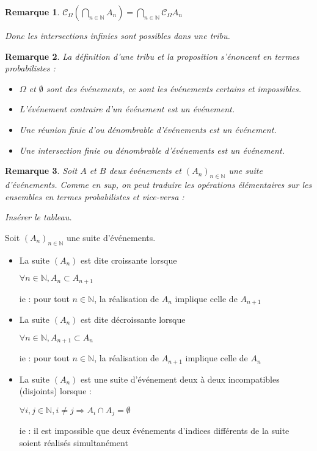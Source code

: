 \documentclass[a4paper,12pt]{book}
\newcommand{\Def}[2]{\begin{tcolorbox}[sharp corners, colback=white,colframe=blue!90!black!75, title=Définition : #1]#2\end{tcolorbox}}
\newtheorem{Rem}{Remarque}[section]
\def\N{\mathbb{N}}
\begin{document}
\begin{Rem}
$\mathcal{C}_\Omega\left(\bigcap_{n\in\N}A_n\right) = \bigcap_{n\in\N}\mathcal{C}_\Omega A_n$
\par Donc les intersections infinies sont possibles dans une tribu.
\end{Rem}
\begin{Rem}
La définition d'une tribu et la proposition s'énoncent en termes probabilistes :\begin{itemize}
\item $\Omega$ et $\emptyset$ sont des événements, ce sont les événements certains et impossibles.
\item L'événement contraire d'un événement est un événement.
\item Une réunion finie d'ou dénombrable d'événements est un événement.
\item Une intersection finie ou dénombrable d'événements est un événement.
\end{itemize}
\end{Rem}
\begin{Rem}
Soit $A$ et $B$ deux événements et $(A_n)_{n\in\N}$ une suite d'événements. Comme en sup, on peut traduire les opérations élémentaires sur les ensembles en termes probabilistes et vice-versa :
\par Insérer le tableau.
\end{Rem}
\Def{}{Soit $(A_n)_{n\in\N}$ une suite d'événements.\begin{itemize}
\item La suite $(A_n)$ est dite croissante lorsque \par\begin{center}$\forall n\in\N, A_n\subset A_{n+1}$\end{center} \par ie : pour tout $n\in\N$, la réalisation de $A_n$ implique celle de $A_{n+1}$
\item La suite $(A_n)$ est dite décroissante lorsque \par\begin{center}$\forall n\in\N, A_{n+1}\subset A_{n}$\end{center} \par ie : pour tout $n\in\N$, la réalisation de $A_{n+1}$ implique celle de $A_{n}$
\item La suite $(A_n)$ est une suite d'événement deux à deux incompatibles (disjoints) lorsque : \par\begin{center}$\forall i,j\in\N, i\neq j\Rightarrow A_i\cap A_j=\emptyset$\end{center} \par ie : il est impossible que deux événements d'indices différents de la suite soient réalisés simultanément
\end{itemize}}
\end{document}
